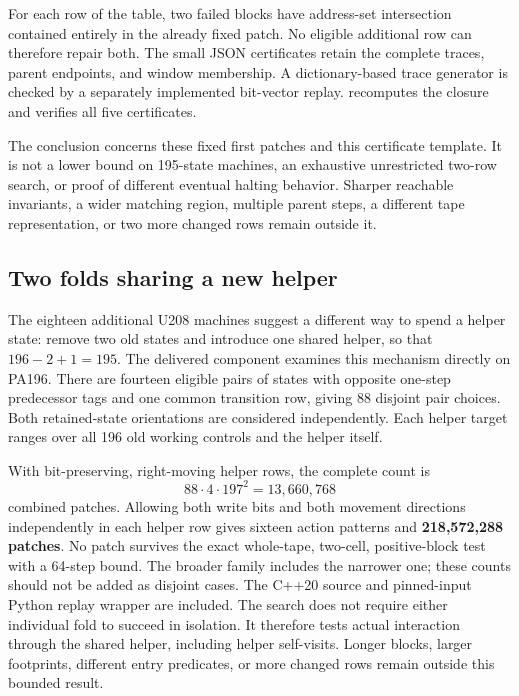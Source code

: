 For each row of the table, two failed blocks have address-set intersection
contained entirely in the already fixed patch. No eligible additional row
can therefore repair both. The small JSON certificates retain the complete
traces, parent endpoints, and window membership. A dictionary-based trace
generator is checked by a separately implemented bit-vector replay.
 recomputes the closure and
verifies all five certificates.

The conclusion concerns these fixed first patches and this certificate
template. It is not a lower bound on 195-state machines, an exhaustive
unrestricted two-row search, or proof of different eventual halting behavior.
Sharper reachable invariants, a wider matching region, multiple parent steps,
a different tape representation, or two more changed rows remain outside it.

\subsection{Two folds sharing a new helper}

The eighteen additional U208 machines suggest a different way to spend
a helper state: remove two old states and introduce one shared helper,
so that $196-2+1=195$. The delivered  component
examines this mechanism directly on PA196. There are fourteen eligible
pairs of states with opposite one-step predecessor tags and one common
transition row, giving 88 disjoint pair choices. Both retained-state
orientations are considered independently. Each helper target ranges over
all 196 old working controls and the helper itself.

With bit-preserving, right-moving helper rows, the complete count is
\[
 88\cdot4\cdot197^2=13,660,768
\]
combined patches. Allowing both write bits and both movement directions
independently in each helper row gives sixteen action patterns and
\textbf{218,572,288 patches}. No patch survives the exact whole-tape,
two-cell, positive-block test with a 64-step bound. The broader family
includes the narrower one; these counts should not be added as disjoint
cases. The C++20 source and pinned-input Python replay wrapper are included.
The search does not require either individual fold to succeed in isolation.
It therefore tests actual interaction through the shared helper, including
helper self-visits. Longer blocks, larger footprints, different entry
predicates, or more changed rows remain outside this bounded result.


